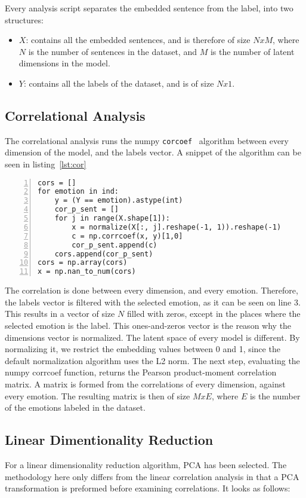 Every analysis script separates the embedded sentence from the label, into two structures:

\begin{itemize}
  \item $X$: contains all the embedded sentences, and is therefore of size $NxM$, where $N$ is the number of sentences in the dataset, and $M$ is the number of latent dimensions in the model.
  \item $Y$: contains all the labels of the dataset, and is of size $Nx1$.
\end{itemize}

\subsection{Correlational Analysis}\label{sub:Correlational Analysis}
The correlational analysis runs the numpy \lstinline{corcoef}~\cite{oliphant2006numpy} algorithm between every dimension of the model, and the labels vector. A snippet of the algorithm can be seen in listing~\ref{lst:cor}

\begin{lstlisting}[caption={Corrlelation Algorithm},label=lst:cor,frame=single,numbers=left]
cors = []
for emotion in ind:
    y = (Y == emotion).astype(int)
    cor_p_sent = []
    for j in range(X.shape[1]):
        x = normalize(X[:, j].reshape(-1, 1)).reshape(-1)
        c = np.corrcoef(x, y)[1,0]
        cor_p_sent.append(c)
    cors.append(cor_p_sent)
cors = np.array(cors)
x = np.nan_to_num(cors)
\end{lstlisting}

The correlation is done between every dimension, and every emotion. Therefore, the labels vector is filtered with the selected emotion, as it can be seen on line 3. This results in a vector of size $N$ filled with zeros, except in the places where the selected emotion is the label. This ones-and-zeros vector is the reason why the dimensions vector is normalized. The latent space of every model is different. By normalizing it, we restrict the embedding values between 0 and 1, since the default normalization algorithm uses the L2 norm.
The next step, evaluating the numpy corrcoef function, returns the Pearson product-moment correlation matrix.
A matrix is formed from the correlations of every dimension, against every emotion. The resulting matrix is then of size $MxE$, where $E$ is the number of the emotions labeled in the dataset.


\subsection{Linear Dimentionality Reduction}\label{sub:Linear Dimentionality Reduction}
For a linear dimensionality reduction algorithm, PCA has been selected. The methodology here only differs from the linear correlation analysis in that a PCA transformation is preformed before examining correlations. It looks as follows:

